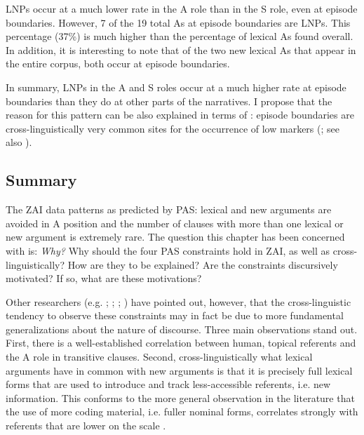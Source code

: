 LNPs occur at a much lower rate in the A role than in the S role, even at episode boundaries. However, 7 of the 19 total As at episode boundaries are LNPs. This percentage (37{\%}) is much higher than the percentage of lexical As found overall. In addition, it is interesting to note that of the two new lexical As that appear in the entire corpus, both occur at episode boundaries. 

In summary, LNPs in the A and S roles occur at a much higher rate at episode boundaries than they do at other parts of the narratives. I propose that the reason for this pattern can be also explained in terms of : episode boundaries are cross-linguistically very common sites for the occurrence of low  markers (\citealt[52]{ariel2001}; see also \citealt{downing1980}).


\subsection{Summary}\label{discussion}

The ZAI data patterns as predicted by PAS: lexical and new arguments are avoided in A position and the number of clauses with more than one lexical or new argument is extremely rare. The question this chapter has been concerned with is: \textit{Why?} Why should the four PAS constraints hold in ZAI, as well as cross-linguistically? How are they to be explained? Are the constraints discursively motivated? If so, what are these motivations? 


Other researchers (e.g. \citealt{haspelmath2006}; \citealt{everett2009}; \citealt{haig2016}; \citealt{schnell2017}) have pointed out, however, that the cross-linguistic tendency to observe these constraints may in fact be due to more fundamental generalizations about the nature of discourse. Three main observations stand out. First, there is a well-established correlation between human, topical referents and the A role in transitive clauses. Second, cross-linguistically what lexical arguments have in common with new arguments is that it is precisely full lexical forms that are used to introduce and track less-accessible \citep{ariel1990} referents, i.e. new information. This conforms to the more general observation in the literature that the use of more coding material, i.e. fuller nominal forms, correlates strongly with referents that are lower on the  scale \citep{givon1983}. 

